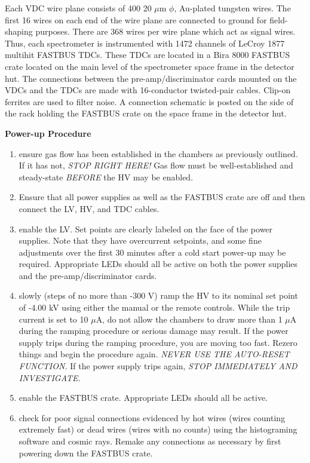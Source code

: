 \documentclass[12pt]{article}
\begin{document}
Each VDC wire plane consists of 400 20 $\mu$m $\phi$, Au-plated
tungsten wires.  The first 16 wires on each end of the wire plane
are connected to ground for field-shaping purposes.  There are
368 wires per wire plane which act as signal wires.  Thus, each
spectrometer is instrumented with 1472 channels of LeCroy 1877
multihit FASTBUS TDCs.  These TDCs are located in a Bira 8000 FASTBUS
crate located on the main level of the spectrometer space frame in
the detector hut.  The connections between the pre-amp/discriminator
cards mounted on the VDCs and the TDCs are made with 16-conductor
twisted-pair cables.  Clip-on ferrites are used to filter noise.
A connection schematic is posted on the side of the rack holding
the FASTBUS crate on the space frame in the detector hut.

\begin{center}
{\bf Power-up Procedure}
\end{center}

\begin{enumerate}
\item {ensure gas flow has been established in the chambers as
previously outlined.  If it has not, {\it STOP RIGHT
HERE!}  Gas flow must be well-established and steady-state
{\it BEFORE} the HV may be enabled.}
\item {Ensure that all power supplies as well as the FASTBUS crate
are off and then connect the LV, HV, and TDC cables.}
\item {enable the LV.  Set points are clearly labeled on the face of
the power supplies.  Note that they have overcurrent setpoints, and
some fine adjustments over the first 30 minutes after a cold start
power-up may be required.  Appropriate LEDs should all be active on
both the power supplies and the pre-amp/discriminator cards.}
\item {slowly (steps of no more than -300 V) ramp the HV to its
nominal set point of -4.00 kV using either the manual or the remote
controls.   While the trip current is set to 10 $\mu$A, do not allow
the chambers to draw more than 1 $\mu$A during the ramping procedure
or serious damage may result.  If the power supply trips during the
ramping procedure, you are moving too fast.  Rezero things and begin
the procedure again.  {\it NEVER USE THE AUTO-RESET FUNCTION.}}  If
the power supply trips again, {\it STOP IMMEDIATELY AND INVESTIGATE.}
\item {enable the FASTBUS crate.  Appropriate LEDs should all be
active.}
\item {check for poor signal connections evidenced by hot wires (wires
counting extremely fast) or dead wires (wires with no counts) using
the histograming software and cosmic rays.  Remake any connections as
necessary by first powering down the FASTBUS crate.}
\end{enumerate}
\end{document}
